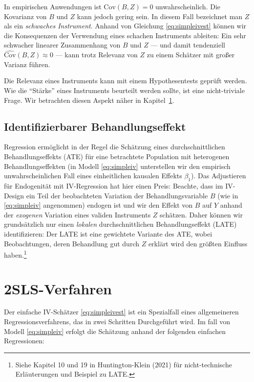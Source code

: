 \documentclass[
  a4paper,
  DIV=11,
  oneside]{scrreprt}
\begin{document}
In empirischen Anwendungen ist \(\text{Cov}(B,Z) = 0\) unwahrscheinlich.
Die Kovarianz von \(B\) und \(Z\) kann jedoch gering sein. In diesem
Fall bezeichnet man \(Z\) als ein \emph{schwaches Instrument}. Anhand
von Gleichung \eqref{eq:simpleivest} können wir die Konsequenzen der
Verwendung eines schachen Instruments ableiten: Ein sehr schwacher
linearer Zusammenhang von \(B\) und \(Z\) --- und damit tendenziell
\(\widehat{\text{Cov}}(B,Z) \approx 0\) --- kann trotz Relevanz von
\(Z\) zu einem Schätzer mit großer Varianz führen.

Die Relevanz eines Instruments kann mit einem Hypothesentests geprüft
werden. Wie die ``Stärke'' eines Instruments beurteilt werden sollte,
ist eine nicht-triviale Frage. Wir betrachten diesen Aspekt näher in
Kapitel~\ref{sec-2SLS}.

\subsection{Identifizierbarer
Behandlungseffekt}\label{identifizierbarer-behandlungseffekt}

Regression ermöglicht in der Regel die Schätzung eines
durchschnittlichen Behandlungseffekts (ATE) für eine betrachtete
Population mit heterogenen Behandlungseffekten (in Modell
\eqref{eq:simpleiv} unterstellen wir den empirisch unwahrscheinlichen
Fall eines einheitlichen kausalen Effekts \(\beta_1\)). Das Adjustieren
für Endogenität mit IV-Regression hat hier einen Preis: Beachte, dass im
IV-Design ein Teil der beobachteten Variation der Behandlungsvariable
\(B\) (wie in \eqref{eq:simpleiv} angenommen) endogen ist und wir den
Effekt von \(B\) auf \(Y\) anhand der \emph{exogenen} Variation eines
validen Instruments \(Z\) schätzen. Daher können wir grundsätzlich nur
einen \emph{lokalen} durchschnittlichen Behandlungseffekt (LATE)
identifizieren: Der LATE ist eine gewichtete Variante des ATE, wobei
Beobachtungen, deren Behandlung gut durch \(Z\) erklärt wird den größten
Einfluss haben.\footnote{Siehe Kapitel 10 und 19 in Huntington-Klein
  (2021) für nicht-technische Erläuterungen und Beispiel zu LATE.}

\section{2SLS-Verfahren}\label{sec-2SLS}

Der einfache IV-Schätzer \eqref{eq:simpleivest} ist ein Spezialfall
eines allgemeineren Regressionsverfahrens, das in zwei Schritten
Durchgeführt wird. Im fall von Modell \eqref{eq:simpleiv} erfolgt die
Schätzung anhand der folgenden einfachen Regressionen:
\end{document}

